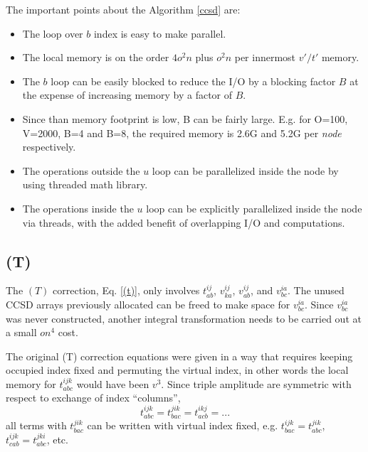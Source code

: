 \documentclass[12pt]{article} \usepackage[margin=1in]{geometry}
\begin{document}
The important points about the Algorithm \ref{ccsd} are:
\begin{itemize}
\item The loop over $b$ index is easy to make parallel.
\item The local memory is on the order $4o^2n$ plus $o^2n$ per
  innermost $v'/t'$ memory.
\item The $b$ loop can be easily blocked to reduce the I/O by a
  blocking factor $B$ at the expense of increasing
  memory by a factor of $B$.
\item Since than memory footprint is low, B can be
  fairly large.   E.g. for O=100, V=2000, B=4 and B=8, the required memory is
  2.6G and 5.2G per {\it node} respectively.
\item  The operations outside the $u$ loop can be  parallelized inside
  the node by using threaded math library.
\item  The operations inside the $u$ loop can be explicitly
  parallelized inside the node via threads,
 with the added benefit of overlapping I/O and computations.
\end{itemize}


\subsection{(T)}
The $(T)$ correction, Eq. \ref{(t)}, only involves $t^{ij}_{ab}$,
$v^{ij}_{ka}$, $v^{ij}_{ab}$, and $v^{ia}_{bc}$.  The unused CCSD
arrays previously allocated can be freed to make space for
$v^{ia}_{bc}$.  Since $v^{ia}_{bc}$ was never constructed, another
integral transformation needs to be carried out at a small $on^4$
cost.

The original (T) correction equations were given in a way that
requires keeping occupied index fixed and permuting the virtual index,
in other words the local memory for $t^{ijk}_{abc}$ would have been $v^3$.
 Since triple amplitude are symmetric with respect to exchange of
 index ``columns'',
$$t^{ijk}_{abc} = t^{jik}_{bac} = t^{ikj}_{acb} = ...$$
all terms with $t^{jik}_{bac}$ can be written with virtual index
fixed, e.g.
$t^{ijk}_{bac} = t^{jik}_{abc}$,
$t^{ijk}_{cab} = t^{jki}_{abc}$, etc.
\end{document}
